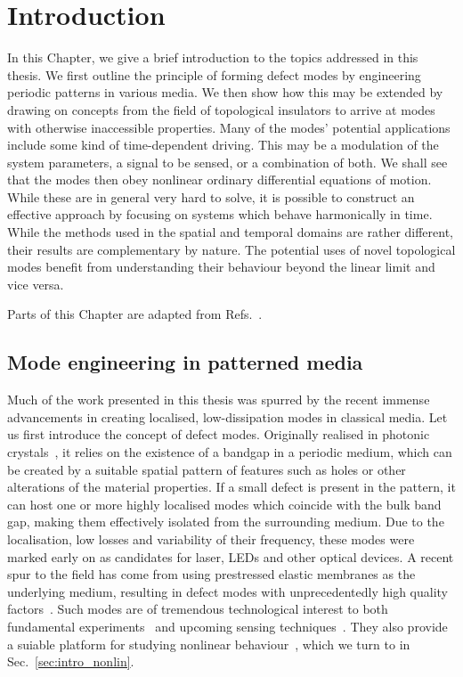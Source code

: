 
\chapter{Introduction} \label{ch:intro} 

\begin{chapterabstract}
	
	In this Chapter, we give a brief introduction to the topics addressed in this thesis. We first outline the principle of forming defect modes by engineering periodic patterns in various media. We then show how this may be extended by drawing on concepts from the field of topological insulators to arrive at modes with otherwise inaccessible properties. 
	Many of the modes' potential applications include some kind of time-dependent driving. This may be a modulation of the system parameters, a signal to be sensed, or a combination of both. We shall see that the modes then obey nonlinear ordinary differential equations of motion. While these are in general very hard to solve, it is possible to construct an effective approach by focusing on systems which behave harmonically in time.
	While the methods used in the spatial and temporal domains are rather different, their results are complementary by nature. The potential uses of novel topological modes benefit from understanding their behaviour beyond the linear limit and vice versa.

	\tcblower
	Parts of this Chapter are adapted from Refs.~\cite{Kosata_2022a, Kosata_2021}.
\end{chapterabstract}

\section{Mode engineering in patterned media}

Much of the work presented in this thesis was spurred by the recent immense advancements in creating localised, low-dissipation modes in classical media. Let us first introduce the concept of defect modes. Originally realised in photonic crystals~\cite{Joannopoulos_1997}, it relies on the existence of a bandgap in a periodic medium, which can be created by a suitable spatial pattern of features such as holes or other alterations of the material properties. If a small defect is present in the pattern, it can host one or more highly localised modes which coincide with the bulk band gap, making them effectively isolated from the surrounding medium. Due to the localisation, low losses and variability of their frequency, these modes were marked early on as candidates for laser, LEDs and other optical devices. A recent spur to the field has come from using prestressed elastic membranes as the underlying medium, resulting in defect modes with unprecedentedly high quality factors~\cite{Tsaturyan_2017}. Such modes are of tremendous technological interest to both fundamental experiments~\cite{Mason_2019, Rossi_2018} and upcoming sensing techniques~\cite{Haelg_2022, Haelg_2021, Kosata_2020}. They also provide a suiable platform for studying nonlinear behaviour~\cite{Catalini_2021}, which we turn to in Sec.~\ref{sec:intro_nonlin}. 

